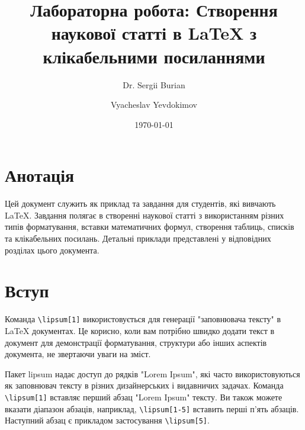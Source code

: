 


	\onehalfspacing  %
	\title{Лабораторна робота: Створення наукової статті в LaTeX з клікабельними посиланнями}
	\author{Dr. Sergii Burian \and Vyacheslav Yevdokimov}
	\date{\today}
	\maketitle
	\thispagestyle{plain}
	
	\newpage  %
	\thispagestyle{empty}  %
	\mbox{}  %
	
	\newpage  %
	
	\tableofcontents  %
	
	\newpage  %
	
	\section*{Анотація}
	Цей документ служить як приклад та завдання для студентів, які вивчають LaTeX. Завдання полягає в створенні наукової статті з використанням різних типів форматування, вставки математичних формул, створення таблиць, списків та клікабельних посилань. Детальні приклади представлені у відповідних розділах цього документа.
	
	\newpage
	
	\section{Вступ}
	Команда \texttt{\textbackslash lipsum[1]} використовується для генерації "заповнювача тексту" в LaTeX документах. Це корисно, коли вам потрібно швидко додати текст в документ для демонстрації форматування, структури або інших аспектів документа, не звертаючи уваги на зміст.
	
	Пакет lipsum надає доступ до рядків "Lorem Ipsum", які часто використовуються як заповнювач тексту в різних дизайнерських і видавничих задачах. Команда \texttt{\textbackslash lipsum[1]} вставляє перший абзац "Lorem Ipsum" тексту. Ви також можете вказати діапазон абзаців, наприклад, \texttt{\textbackslash lipsum[1-5]} вставить перші п'ять абзаців. Наступний абзац є прикладом застосування  \texttt{\textbackslash lipsum[5]}.
	
	\lipsum[4]
	
